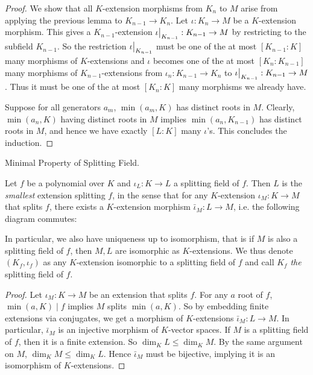 \documentclass[../book.tex]{subfiles}
\begin{document}
\begin{proof}
    We show that all $K$-extension morphisms from $K_n$ to $M$
    arise from applying the previous lemma to $K_{n-1} \to K_n$. 
    Let $\iota : K_n \to M$ be a $K$-extension morphism. 
    This gives a $K_{n-1}$-extension $\res{\iota}{K_{n-1}} : K_{n-1} \to M$ 
    by restricting to the subfield $K_{n-1}$.
    So the restriction $\res{\iota}{K_{n-1}}$ must be 
    one of the at most $[K_{n-1} : K]$ many morphisms of $K$-extensions
    and $\iota$ becomes one of the at most $[K_n : K_{n-1}]$ many 
    morphisms of $K_{n-1}$-extensions from 
    $\iota_n : K_{n-1} \to K_n$ to $\res{\iota}{K_{n-1}} : K_{n-1} \to M$.
    Thus it must be one of the at most $[K_n : K]$ many morphisms we already have. 
    
    Suppose for all generators $a_m$, $\min(a_m,K)$ has distinct roots in $M$.
    Clearly, $\min(a_n,K)$ having distinct roots in $M$ implies 
    $\min(a_n,K_{n-1})$ has distinct roots in $M$,
    and hence we have exactly $[L : K]$ many $\iota$'s.
    This concludes the induction.
\end{proof}
\begin{thm} Minimal Property of Splitting Field. 
    
    Let $f$ be a polynomial over $K$ and 
    $\iota_L : K \to L$ a splitting field of $f$.
    Then $L$ is the \emph{smallest} extension splitting $f$, in the sense that 
    for any $K$-extension $\iota_M : K \to M$ that splits $f$, 
    there exists a $K$-extension morphism $\bar\iota_M : L \to M$,
    i.e. the following diagram commutes: 
    \begin{figure}[H]
        \centering
    \end{figure}
    In particular, we also have uniqueness up to isomorphism, that is
    if $M$ is also a splitting field of $f$, 
    then $M,L$ are isomorphic as $K$-extensions.
    We thus denote $(K_f,\iota_f)$ as any $K$-extension
    isomorphic to a splitting field of $f$ 
    and call $K_f$ \emph{the} splitting field of $f$. 
    
\end{thm}
\begin{proof}
    Let $\iota_M : K \to M$ be an extension that splits $f$. 
    For any $a$ root of $f$, $\min(a,K) \mid f$ implies $M$ splits $\min(a,K)$.
    So by embedding finite extensions via conjugates,
    we get a morphism of $K$-extensions $\bar\iota_M : L \to M$. 
    In particular, $\bar\iota_M$ is an injective morphism of $K$-vector spaces.
    If $M$ is a splitting field of $f$, then it is a finite extension.
    So $\dim_K L \leq \dim_K M$. 
    By the same argument on $M$, $\dim_K M \leq \dim_K L$.
    Hence $\bar\iota_M$ must be bijective,
    implying it is an isomorphism of $K$-extensions. 
\end{proof}
\end{document}
